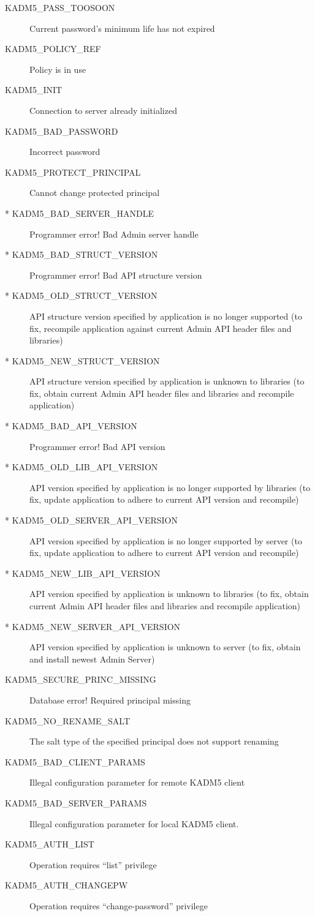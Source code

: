 \begin{description}
\item[KADM5_PASS_TOOSOON] Current password's minimum life has not
expired
\item[KADM5_POLICY_REF] Policy is in use
\item[KADM5_INIT] Connection to server already initialized
\item[KADM5_BAD_PASSWORD] Incorrect password
\item[KADM5_PROTECT_PRINCIPAL] Cannot change protected principal
\item[* KADM5_BAD_SERVER_HANDLE] Programmer error!  Bad Admin server handle
\item[* KADM5_BAD_STRUCT_VERSION] Programmer error!  Bad API structure version
\item[* KADM5_OLD_STRUCT_VERSION] API structure version specified by application is no longer supported (to fix, recompile application against current Admin API header files and libraries)
\item[* KADM5_NEW_STRUCT_VERSION] API structure version specified by application is unknown to libraries (to fix, obtain current Admin API header files and libraries and recompile application)
\item[* KADM5_BAD_API_VERSION] Programmer error!  Bad API version
\item[* KADM5_OLD_LIB_API_VERSION] API version specified by application is no longer supported by libraries (to fix, update application to adhere to current API version and recompile)
\item[* KADM5_OLD_SERVER_API_VERSION] API version specified by application is no longer supported by server (to fix, update application to adhere to current API version and recompile)
\item[* KADM5_NEW_LIB_API_VERSION] API version specified by application is unknown to libraries (to fix, obtain current Admin API header files and libraries and recompile application)
\item[* KADM5_NEW_SERVER_API_VERSION] API version specified by
application is unknown to server (to fix, obtain and install newest
Admin Server)
\item[KADM5_SECURE_PRINC_MISSING] Database error! Required principal missing
\item[KADM5_NO_RENAME_SALT] The salt type of the specified principal
does not support renaming
\item[KADM5_BAD_CLIENT_PARAMS] Illegal configuration parameter for
remote KADM5 client
\item[KADM5_BAD_SERVER_PARAMS] Illegal configuration parameter for
local KADM5 client.
\item[KADM5_AUTH_LIST] Operation requires ``list'' privilege
\item[KADM5_AUTH_CHANGEPW] Operation requires ``change-password'' privilege
\end{description}

